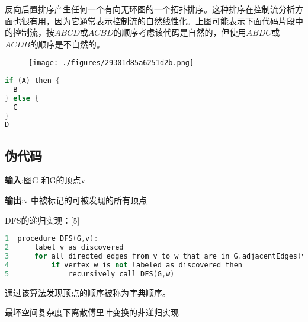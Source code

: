 反向后置排序产生任何一个有向无环图的一个拓扑排序。这种排序在控制流分析方面也很有用，因为它通常表示控制流的自然线性化。上图可能表示下面代码片段中的控制流，按$A B C D$或$A C B D$的顺序考虑该代码是自然的，但使用$A B D C$或$A C D B$的顺序是不自然的。
\begin{figure}[ht]
\centering
\texttt{[image: ./figures/29301d85a6251d2b.png]}
\caption\label{fig_SDYXSS_3}
\end{figure}
\begin{lstlisting}[language=cpp]
if (A) then {
  B
} else {
  C
}
D
\end{lstlisting}

\subsection{伪代码}
\textbf{输入}:图G 和G的顶点v

\textbf{输出}:v 中被标记的可被发现的所有顶点

DFS的递归实现：[5]
\begin{lstlisting}[language=cpp]
1  procedure DFS(G,v):
2      label v as discovered
3      for all directed edges from v to w that are in G.adjacentEdges(v) do
4          if vertex w is not labeled as discovered then
5              recursively call DFS(G,w)
\end{lstlisting}
通过该算法发现顶点的顺序被称为字典顺序。

最坏空间复杂度下离散傅里叶变换的非递归实现